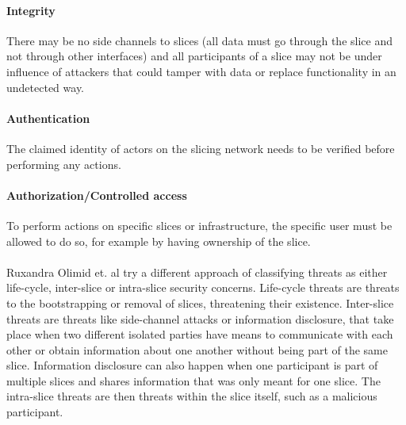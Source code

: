 \paragraph{Integrity} There may be no side channels to slices (all data must go through the slice and not through other interfaces) and all participants of a slice may not be under influence of attackers that could tamper with data or replace functionality in an undetected way.

\paragraph{Authentication} The claimed identity of actors on the slicing network needs to be verified before performing any actions.



\paragraph{Authorization/Controlled access} To perform actions on specific slices or infrastructure, the specific user must be allowed to do so, for example by having ownership of the slice.

\paragraph{}Ruxandra Olimid et. al \cite{SE2} try a different approach of classifying threats as either life-cycle, inter-slice or intra-slice security concerns. Life-cycle threats are threats to the bootstrapping or removal of slices, threatening their existence. Inter-slice threats are threats like side-channel attacks or information disclosure, that take place when two different isolated parties have means to communicate with each other or obtain information about one another without being part of the same slice. Information disclosure can also happen when one participant is part of multiple slices and shares information that was only meant for one slice. The intra-slice threats are then threats within the slice itself, such as a malicious participant.


